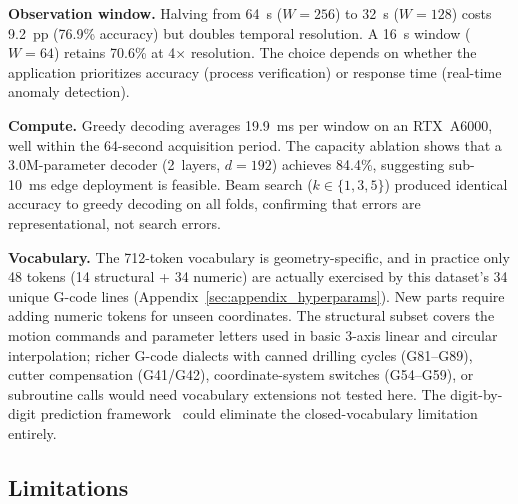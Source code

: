 \documentclass[sensors,article,submit,moreauthors,pdftex]{Definitions/mdpi}
\begin{document}
\textbf{Observation window.} Halving from 64~s ($W{=}256$) to 32~s ($W{=}128$) costs 9.2~pp (76.9\% accuracy) but doubles temporal resolution. A 16~s window ($W{=}64$) retains 70.6\% at 4$\times$ resolution. The choice depends on whether the application prioritizes accuracy (process verification) or response time (real-time anomaly detection).

\textbf{Compute.} Greedy decoding averages 19.9~ms per window on an RTX~A6000, well within the 64-second acquisition period. The capacity ablation shows that a 3.0M-parameter decoder (2~layers, $d{=}192$) achieves 84.4\%, suggesting sub-10~ms edge deployment is feasible. Beam search ($k \in \{1,3,5\}$) produced identical accuracy to greedy decoding on all folds, confirming that errors are representational, not search errors.

\textbf{Vocabulary.} The 712-token vocabulary is geometry-specific, and in practice only 48 tokens (14 structural + 34 numeric) are actually exercised by this dataset's 34 unique G-code lines (Appendix~\ref{sec:appendix_hyperparams}). New parts require adding numeric tokens for unseen coordinates. The structural subset covers the motion commands and parameter letters used in basic 3-axis linear and circular interpolation; richer G-code dialects with canned drilling cycles (G81--G89), cutter compensation (G41/G42), coordinate-system switches (G54--G59), or subroutine calls would need vocabulary extensions not tested here. The digit-by-digit prediction framework~\cite{grammar_paper} could eliminate the closed-vocabulary limitation entirely.

\subsection{Limitations}
\end{document}
